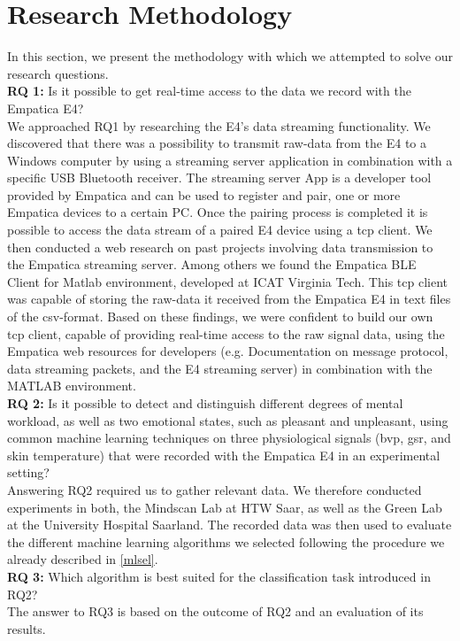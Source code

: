 \section{Research Methodology}\label{meth}
In this section, we present the methodology with which we attempted to solve our research questions.\\[10pt]
\textbf{RQ 1:} Is it possible to get real-time access to the data we record with the Empatica E4?\\[10pt]
We approached RQ1 by researching the E4's data streaming functionality. We discovered that there was a possibility to transmit raw-data from the E4 to a Windows computer by using a streaming server application in combination with a specific USB Bluetooth receiver. The streaming server App is a developer tool provided by Empatica and can be used to register and pair, one or more Empatica devices to a certain PC. Once the pairing process is completed it is possible to access the data stream of a paired E4 device using a \gls{tcp} client. We then conducted a web research on past projects involving data transmission to the Empatica streaming server. Among others we found the Empatica BLE Client for Matlab environment, developed at ICAT Virginia Tech. This \gls{tcp} client was capable of storing the raw-data it received from the Empatica E4 in text files of the \gls{csv}-format. Based on these findings, we were confident to build our own \gls{tcp} client, capable of providing real-time access to the raw signal data, using the Empatica web resources for developers (e.g. Documentation on message protocol, data streaming packets, and the E4 streaming server) in combination with the MATLAB environment. \\[10pt]
\textbf{RQ 2:} Is it possible to detect and distinguish different degrees of mental workload, as well as two emotional states, such as pleasant and unpleasant, using common machine learning techniques on three physiological signals (\gls{bvp}, \gls{gsr}, and skin temperature) that were recorded with the Empatica E4 in an experimental setting?\\[10pt]
Answering RQ2 required us to gather relevant data. We therefore conducted experiments in both, the Mindscan Lab at HTW Saar, as well as the Green Lab at the University Hospital Saarland. The recorded data was then used to evaluate the different machine learning algorithms we selected following the procedure we already described in \ref{mlsel}. \\[10pt]
\textbf{RQ 3:} Which algorithm is best suited for the classification task introduced in RQ2?\\[10pt]
The answer to RQ3 is based on the outcome of RQ2 and an evaluation of its results.
